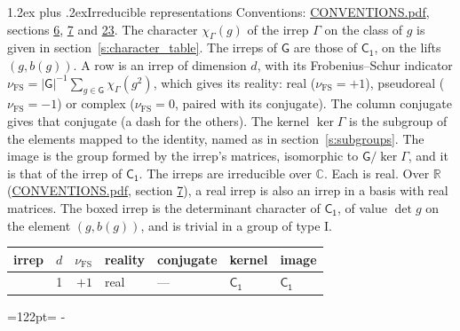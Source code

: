 \documentclass[10pt,a4paper]{article}
\makeatletter
\renewcommand\section{\@startsection{section}{1}{\z@}{-3ex plus -1ex minus -.2ex}%
  {1.2ex plus .2ex}{\normalfont\large\sffamily\bfseries\color{parttitle}}}
\newcommand{\needspace}[1]{\par\penalty-100\begingroup\dimen0=#1\relax\dimen2=\pagegoal
  \advance\dimen2-\pagetotal\ifdim\dimen0>\dimen2\relax\ifdim\dimen2>0pt\vfil\break\fi\fi
  \endgroup}
\numberwithin{equation}{section}
\newcommand{\grp}[1]{\mathsf{#1}}
\newcommand{\irr}[1]{\text{\normalfont\scshape #1}}
\newcommand{\detbox}[1]{{\setlength{\fboxsep}{1pt}\fbox{#1}}}
\newcommand{\irchar}[1]{\chi_{#1}}
\newcommand{\fsind}{\nu_{\mathrm{FS}}}
\makeatother
\begin{document}
\section{Irreducible representations}\label{s:irreps}
Conventions: \href{../../CONVENTIONS.pdf}{CONVENTIONS.pdf}, sections \href{../../../rotation/CONVENTIONS.pdf\#conv.6}{6}, \href{../../../rotation/CONVENTIONS.pdf\#conv.7}{7} and \href{../../CONVENTIONS.pdf\#conv.23}{23}.
\leavevmode\label{n:function.character}\label{n:irrep.Gamma}The character $\irchar{\Gamma}(g)$ of the irrep $\Gamma$ on the class of $g$ is given in section~\ref{s:character_table}. The irreps of $\grp{G}$ are those of \href{../../../rotation/data/pdf/C1.pdf}{$\grp{C_{1}}$}, on the lifts $(g, b(g))$.
\leavevmode\label{n:index.dimension}\label{n:index.frobenius}\label{n:head.irrep}\label{n:head.reality}A row is an irrep of dimension $d$, with its Frobenius--Schur indicator $\fsind = |\grp{G}|^{-1}\allowbreak\sum_{g\in\grp{G}}\irchar{\Gamma}(g^2)$, which gives its reality: real ($\fsind = +1$), pseudoreal ($\fsind = -1$) or complex ($\fsind = 0$, paired with its conjugate). \label{n:head.conjugate}The column conjugate gives that conjugate (a dash for the others). \label{n:head.kernel}The kernel $\ker\Gamma$ is the subgroup of the elements mapped to the identity, named as in section~\ref{s:subgroups}. \label{n:head.image}The image is the group formed by the irrep's matrices, isomorphic to $\grp{G}/\ker\Gamma$, and it is that of the irrep of \href{../../../rotation/data/pdf/C1.pdf}{$\grp{C_{1}}$}. The irreps are irreducible over $\mathbb{C}$. Each is real. Over $\mathbb{R}$ (\href{../../CONVENTIONS.pdf}{CONVENTIONS.pdf}, section \href{../../../rotation/CONVENTIONS.pdf\#conv.7}{7}), a real irrep is also an irrep in a basis with real matrices. \label{n:mark.determinant}The boxed irrep is the determinant character of \href{../../../rotation/data/pdf/C1.pdf}{$\grp{C_{1}}$}, of value $\det g$ on the element $(g, b(g))$, and is trivial in a group of type I.
\setlength{\emergencystretch}{2em}\par\setlength{\emergencystretch}{0pt}
{\small\renewcommand{\arraystretch}{1.25}\begin{longtable}{@{}lrrllll@{}}\toprule
irrep & $d$ & $\fsind$ & reality & conjugate & kernel & image\\\midrule\endhead
\bottomrule\endfoot\endlastfoot
\detbox{$\irr{a}$} & 1 & $+1$ & real & --- & \href{C1.pdf}{$\grp{C_{1}}$} & \href{../../../rotation/data/pdf/C1.pdf}{$\grp{C_{1}}$}\\
\bottomrule\end{longtable}}
\needspace{122pt}
\end{document}
